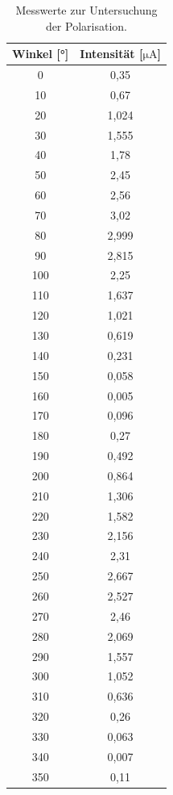\begin{table}[H]
  \centering
\begin{tabular}{c|c}
  Winkel [°]  &  Intensität [$ \si{\micro\ampere}$]     \\
  \hline
0   & 0,35  \\
10  & 0,67  \\
20  & 1,024 \\
30  & 1,555 \\
40  & 1,78  \\
50  & 2,45  \\
60  & 2,56  \\
70  & 3,02  \\
80  & 2,999 \\
90  & 2,815 \\
100 & 2,25  \\
110 & 1,637 \\
120 & 1,021 \\
130 & 0,619 \\
140 & 0,231 \\
150 & 0,058 \\
160 & 0,005 \\
170 & 0,096 \\
180 & 0,27  \\
190 & 0,492 \\
200 & 0,864 \\
210 & 1,306 \\
220 & 1,582 \\
230 & 2,156 \\
240 & 2,31  \\
250 & 2,667 \\
260 & 2,527 \\
270 & 2,46  \\
280 & 2,069 \\
290 & 1,557 \\
300 & 1,052 \\
310 & 0,636 \\
320 & 0,26  \\
330 & 0,063 \\
340 & 0,007 \\
350 & 0,11
\end{tabular}
\caption{Messwerte zur Untersuchung der Polarisation.}
\label{polwert}
\end{table}
